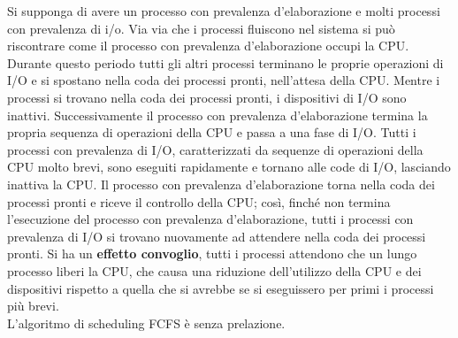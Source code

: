 \documentclass[11pt,a4paper]{article}
\begin{document}
Si supponga di avere un processo con prevalenza d'elaborazione e molti processi con preva­lenza di i/o. Via via che i processi fluiscono nel sistema si può riscontrare come il processo
con prevalenza d'elaborazione occupi la CPU. Durante questo periodo tutti gli altri processi
terminano le proprie operazioni di I/O e si spostano nella coda dei processi pronti, nell'atte­sa della CPU. Mentre i processi si trovano nella coda dei processi pronti, i dispositivi di I/O
sono inattivi. Successivamente il processo con prevalenza d'elaborazione termina la propria
sequenza di operazioni della CPU e passa a una fase di I/O. Tutti i processi con prevalenza di
I/O, caratterizzati da sequenze di operazioni della CPU molto brevi, sono eseguiti rapida­mente e tornano alle code di I/O, lasciando inattiva la CPU. Il processo con prevalenza d'ela­borazione torna nella coda dei processi pronti e riceve il controllo della CPU; così, finché
non termina l'esecuzione del processo con prevalenza d'elaborazione, tutti i processi con
prevalenza di I/O si trovano nuovamente ad attendere nella coda dei processi pronti. Si ha
un \textbf{effetto convoglio}, tutti i processi attendono che un lungo processo liberi la CPU, che causa una riduzione dell'utilizzo della CPU e dei dispositivi rispetto a quella che si avrebbe se si
eseguissero per primi i processi più brevi.\medskip\\
L'algoritmo di scheduling FCFS è senza prelazione.
\end{document}
